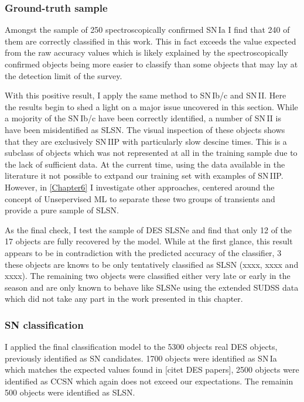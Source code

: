 \subsubsection{Ground-truth sample} \label{sec:SNTruth}
Amongst the sample of 250 spectroscopically confirmed SN\,Ia I find that 240 of them are correctly classified in this work. This in fact exceeds the value expected from the raw accuracy values which is likely explained by the spectroscopically confirmed objects being more easier to classify than some objects that may lay at the detection limit of the survey.

With this positive result, I apply the same method to SN\,Ib/c and SN\,II. Here the results begin to shed a light on a major issue uncovered in this section. While a mojority of the SN\,Ib/c have been correctly identified, a number of SN\,II is have been misidentified as SLSN. The visual inspection of these objects shows that they are exclusively SN\,IIP with particularly slow descine times. This is a subclass of objects which was not represented at all in the training sample due to the lack of sufficient data. At the current time, using the data available in the literature it not possible to extpand our training set with examples of SN\,IIP. However, in \cref{Chapter6} I investigate other approaches, centered around the concept of Unsepervised ML to separate these two groups of transients and provide a pure sample of SLSN.

As the final check, I test the sample of DES SLSNe and find that only 12 of the 17 objects are fully recovered by the model. While at the first glance, this result appears to be in contradiction with the predicted accuracy of the classifier, 3 these objects are knows to be only tentatively classified as SLSN (xxxx, xxxx and xxxx). The remaining two objects were classified either very late or early in the season and are only known to behave like SLSNe using the extended SUDSS data which did not take any part in the work presented in this chapter.

\begin{table}
  \caption{}
  \label{tab:SLSNTruth}

\end{table}

\subsubsection{SN classification}
I applied the final classification model to the 5300 objects real DES objects, previously identified as SN candidates. 1700 objects were identified as SN\,Ia which matches the expected values found in [citet DES papers], 2500 objects were identified as CCSN which again does not exceed our expectations. The remainin 500 objects were identified as SLSN.

